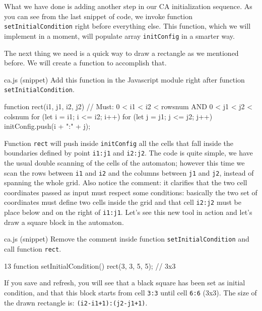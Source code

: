 What we have done is adding another step in our CA initialization sequence. As you can see from
the last snippet of code, we invoke function \texttt{setInitialCondition} right before everything
else. This function, which we will implement in a moment, will populate array \texttt{initConfig}
in a smarter way.

The next thing we need is a quick way to draw a rectangle as we mentioned before. We will create
a function to accomplish that.

\begin{programcode}{ca.js (snippet)}
Add this function in the Javascript module right after function \texttt{setInitialCondition}.
\begin{code}
function rect(i1, j1, i2, j2) {
  // Must: 0 < i1 < i2 < rowsnum AND 0 < j1 < j2 < colsnum
  for (let i = i1; i <= i2; i++) {
    for (let j = j1; j <= j2; j++) {
      initConfig.push(i + ":" + j);
    }
  }
}
\end{code}
\end{programcode}

Function \texttt{rect} will push inside \texttt{initConfig} all the cells that fall inside the
boundaries defined by point \texttt{i1:j1} and \texttt{i2:j2}. The code is quite simple, we have
the usual double scanning of the cells of the automaton; however this time we scan the rows between
\texttt{i1} and \texttt{i2} and the columns between \texttt{j1} and \texttt{j2}, instead of
spanning the whole grid. Also notice the comment: it clarifies that the two cell coordinates
passed as input must respect some conditions: basically the two set of coordinates must define
two cells inside the grid and that cell \texttt{i2:j2} must be place below and on the right
of \texttt{i1:j1}.
Let's see this new tool in action and let's draw a square block in the automaton.

\begin{programcode}{ca.js (snippet)}
Remove the comment inside function \texttt{setInitialCondition} and
call function \texttt{rect}.
\begin{codeh1}{1}{3}
function setInitialCondition() {
  rect(3, 3, 5, 5); // 3x3
}
\end{codeh1}
\end{programcode}

If you save and refresh, you will see that a black square has been set as initial condition,
and that this block starts from cell \texttt{3:3} until cell \texttt{6:6} (3x3).
The size of the drawn rectangle is: \texttt{(i2-i1+1):(j2-j1+1)}.

